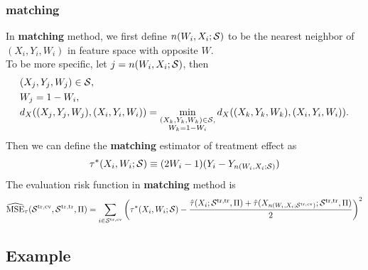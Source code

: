\documentclass[11pt]{article}
\newcommand{\calp}{{\Pi}}
\newcommand{\cals}{{\cal S}}
\newcommand{\mse}{{\rm MSE}}
\newcommand{\train}{{\rm tr}}
\newcommand{\tcv}{{\rm cv}}
\begin{document}
\subsubsection{matching}
In \textbf{matching} method, we first define $n(W_i, X_i; \cals)$ to be the nearest neighbor of $(X_i, Y_i, W_i)$ in feature space with opposite $W$.\\
To be more specific, let $j = n(W_i, X_i; \cals)$, then 
\begin{align*}
 & (X_j, Y_j, W_j) \in \cals, \\
 & W_j = 1 - W_i,\\
 & d_X((X_j, Y_j, W_j), (X_i, Y_i, W_i)) = \min_{\substack{
 (X_k, Y_k, W_k) \in \cals,\\ W_k = 1 - W_i }} d_X((X_k, Y_k, W_k), (X_i, Y_i, W_i)).
\end{align*}
Then we can define the \textbf{matching} estimator of treatment effect as
\[\tau^*(X_i, W_i; \cals) \equiv (2W_i - 1) (Y_i - Y_{n(W_i, X_i; \cals)})\]
The evaluation risk function in \textbf{matching} method is
\[
\widehat\mse_{\tau}(\cals^{\train, \tcv}, \cals^{\train, \train}, \calp) = \sum_{i \in \cals^{\train, \tcv}}\left(\tau^*(X_i, W_i; \cals) - \frac{\hat{\tau}(X_i; \cals^{\train, \train}, \calp) + \hat{\tau}(X_{n(W_i, X_i; \cals^{\train, \tcv})}; \cals^{\train, \train}, \calp )}{2}\right)^2
\]
\subsection{Example}
\end{document}
